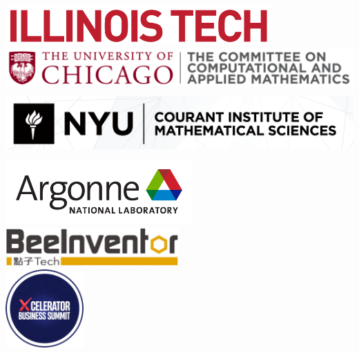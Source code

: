 \begin{center}
\includegraphics[height=1.5cm]{Photos/illinois_tech_logo_full.png} \\[1em]
\includegraphics[height=1.5cm]{Photos/uchicago_cam_logo.png} \\[1em]
\includegraphics[height=2.5cm]{Photos/nyu_courant_logo.png} \\[1em]
\includegraphics[height=2.5cm]{Photos/argonne_logo.png} \\[1em]
\includegraphics[height=1.5cm]{Photos/beeinventor_logo.png} \\[1em]
\includegraphics[height=3cm]{Photos/xcelerator_logo.png}

\end{center}



